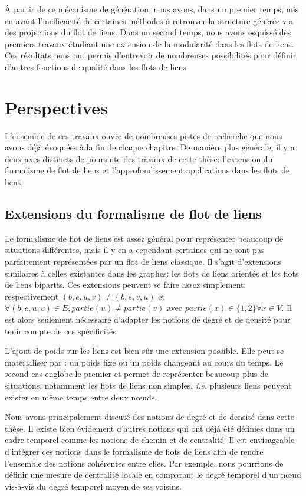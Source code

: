 \`A partir de ce mécanisme de génération, nous avons, dans un premier temps, mis en avant l'inefficacité de certaines méthodes à retrouver la structure générée via des projections du flot de liens.
Dans un second temps, nous avons esquissé des premiers travaux étudiant une extension de la modularité dans les flots de liens.
Ces résultats nous ont permis d'entrevoir de nombreuses possibilités pour définir d'autres fonctions de qualité dans les flots de liens.

\section{Perspectives}

L'ensemble de ces travaux ouvre de nombreuses pistes de recherche que nous avons déjà évoquées à la fin de chaque chapitre.
De manière plus générale, il y a deux axes distincts de poursuite des travaux de cette thèse: l'extension du formalisme de flot de liens et l'approfondissement applications dans les flots de liens.

\subsection{Extensions du formalisme de flot de liens}

Le formalisme de flot de liens est assez général pour représenter beaucoup de situations différentes, mais il y en a cependant certaines qui ne sont pas parfaitement représentées par un flot de liens classique.
Il s'agit d'extensions similaires à celles existantes dans les graphes: les flots de liens orientés et les flots de liens bipartis.
Ces extensions peuvent se faire assez simplement: respectivement $(b,e,u,v)\neq (b,e,v,u)$ et $\forall (b,e,u,v) \in E, partie(u)\neq partie(v)$ avec $partie(x) \in \{1,2\} \forall x \in V$.
Il est alors seulement nécessaire d'adapter les notions de degré et de densité pour tenir compte de ces spécificités.

L'ajout de poids sur les liens est bien sûr une extension possible.
Elle peut se matérialiser par : un poids fixe ou un poids changeant au cours du temps.
Le second cas englobe le premier et permet de représenter beaucoup plus de situations, notamment les flots de liens non simples, \emph{i.e.} plusieurs liens peuvent exister en même temps entre deux n\oe{}uds.

Nous avons principalement discuté des notions de degré et de densité dans cette thèse.
Il existe bien évidement d'autres notions qui ont déjà été définies dans un cadre temporel comme les notions de chemin et de centralité.
Il est envisageable d'intégrer ces notions dans le formalisme de flots de liens afin de rendre l'ensemble des notions cohérentes entre elles.
Par exemple, nous pourrions de définir une mesure de centralité locale en comparant le degré temporel d'un n\oe{}ud vis-à-vis du degré temporel moyen de ses voisins.

